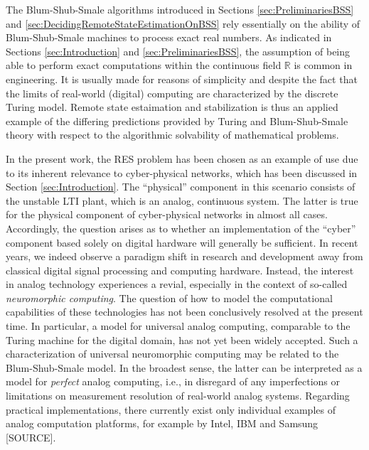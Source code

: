 \documentclass[conference]{IEEEtran}
\def\RR{{\mathbb R}}
\newcommand{\sdummy}{{\color{red}[SOURCE]}}
\begin{document}
	The Blum-Shub-Smale algorithms introduced in Sections \ref{sec:PreliminariesBSS} and \ref{sec:DecidingRemoteStateEstimationOnBSS} rely essentially on the 
	ability of Blum-Shub-Smale machines to process exact real numbers. As indicated in Sections \ref{sec:Introduction} and \ref{sec:PreliminariesBSS}, 
	the assumption of being able to perform exact computations within the continuous field \(\RR\) is common in engineering. It is usually made for reasons 
	of simplicity and despite the fact that the limits of real-world (digital) computing are characterized by the discrete Turing model. Remote state estaimation
	and stabilization is thus an applied example of the differing predictions provided by Turing and Blum-Shub-Smale theory with respect to the algorithmic
	solvability of mathematical problems.
	
	In the present work, the RES problem has been chosen as an example of use due to its inherent relevance to cyber-physical networks,
	which has been discussed in Section \ref{sec:Introduction}. The ``physical'' component in this scenario consists of the unstable LTI plant, which is an analog, 
	continuous system. The latter is true for the physical component of cyber-physical networks in almost all cases. Accordingly, the question arises as to 
	whether an implementation of the ``cyber'' component based solely on digital hardware will generally be sufficient.
	In recent years, we indeed observe a paradigm shift in research and development away from classical digital signal processing and computing hardware.
	Instead, the interest in analog technology experiences a revial, especially in the context of so-called \emph{neuromorphic computing}. 
	The question of how to model the computational capabilities of these technologies has not been conclusively resolved at the present time.
	In particular, a model for universal analog computing, comparable to the Turing machine for the digital domain, has not yet been widely accepted. 
	Such a characterization of universal neuromorphic computing may be related to the Blum-Shub-Smale model. In the broadest sense, the latter can be
	interpreted as a model for \emph{perfect} analog computing, i.e., in disregard of any imperfections or limitations on measurement resolution of real-world analog systems.
	Regarding practical implementations, there currently exist only individual examples of analog computation platforms, for example by Intel, IBM and Samsung \sdummy.
\end{document}
